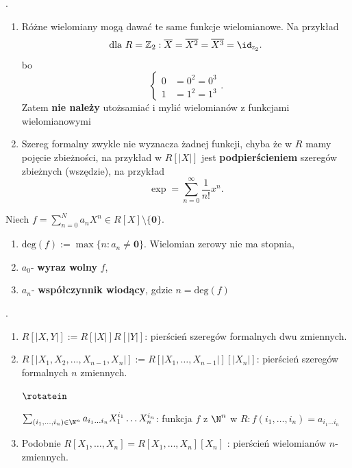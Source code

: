 \begin{remark}
	.

	\begin{enumerate}[label=\arabic*)]
		\item Różne wielomiany mogą dawać te same funkcje wielomianowe. Na przykład
			\[
			\text{dla } R = \mathbb{Z} _{2}: \overline{X}= \overline{X^2} = \overline{X^3} = \id_{\scriptscriptstyle \mathbb{Z}_{2}}
			.\] 
			bo
			\[
			\begin{cases}
				0 &= 0^2 = 0^3 \\
				1 &= 1^2 = 1^3
			\end{cases}
			.\] 
			Zatem \textbf{nie należy} utożsamiać i mylić wielomianów z funkcjami wielomianowymi
		\item Szereg formalny zwykle nie wyznacza żadnej funkcji, chyba że w $R$ mamy pojęcie zbieżności, na przykład w $R\left[ \left| X \right|  \right] $ jest \textbf{podpierścieniem} szeregów zbieżnych (wszędzie), na przykład 
			\[
			\exp = \sum_{n=0}^{\infty} \frac{1}{n!}x^{n}
			.\] 
	\end{enumerate}
\end{remark} 
\begin{definition}
	Niech $f = \sum_{n=0}^{N} a_{n} X^{n}\in R\left[ X \right] \setminus \{\mathbf{0}\} $.
	\begin{enumerate}[label=\arabic*)]
		\item $\text{deg}\left( f \right):= \max \{n: a_{n} \neq \mathbf{0}\}.$ Wielomian zerowy nie ma stopnia,
		\item $a_0$- \textbf{wyraz wolny} $f$,
		\item $a_{n}$- \textbf{współczynnik wiodący}, gdzie $n = \text{deg}\left( f \right) $
	\end{enumerate}
\end{definition} 
\begin{definition}
	.
	\begin{enumerate}[label=\arabic*)]
		\item $R\left[ \left| X,Y \right|  \right] := R\left[ \left| X \right|  \right] R\left[ \left| Y \right|  \right] $: pierścień szeregów formalnych dwu zmiennych.
		\item $R\left[ \left| X_1,X_2,\ldots, X_{n-1},X_{n}  \right|  \right] := R\left[ \left| X_1,\ldots,X_{n-1} \right|  \right] \left[ \left| X_{n}  \right|  \right] $: pierścień szeregów formalnych $n$ zmiennych.

			$\rotatein$

			 $\sum_{(i_1,\ldots,i_{n})\in \N^{n}} a_{i_1 \ldots i_{n}}X_1^{i_1}\ldots X_{n}^{i_{n}}$: funkcja $f$ z $\N^{n}$ w $R: f\left( i_1,\ldots,i_{n} \right) = a_{i_1\ldots i_{n}}$
		 \item Podobnie $R\left[ X_1,\ldots,X_{n}  \right] = R\left[  X_1,\ldots,X_{n} \right]\left[ X_{n} \right]  $ : pierścień wielomianów $n$-zmiennych.
	\end{enumerate}
\end{definition} 

